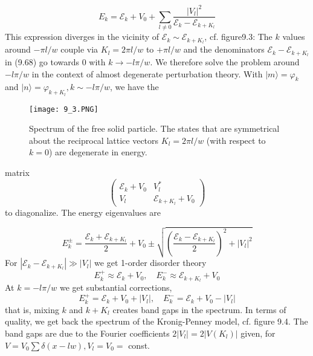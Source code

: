 \begin{equation}
    E_{k}=\mathcal{E}_{k}+V_{0}+\sum_{l \neq 0} \frac{\left|V_{l}\right|^{2}}{\mathcal{E}_{k}-\mathcal{E}_{k+K_{l}}}
    \end{equation}
This expression diverges in the vicinity of $\mathcal{E}_{k} \sim \mathcal{E}_{k+K_{l}}$, cf. figure9.3: The $k$ values ​​around $−\pi l / w$ couple via $K_{l}=2 \pi l / w$ to $+\pi l/w$ and the denominators $\mathcal{E}_{k} - \mathcal{E}_{k+K_{l}}$ in (9.68) go towards 0 with $k \rightarrow −l\pi / w$. We therefore solve the problem around $−l\pi / w$ in the context of almost degenerate perturbation theory. With $| m\rangle = \varphi_k$ and $| n\rangle = \varphi_{k + K_l}, k \sim −l\pi / w$, we have the
\begin{figure}[ht]
        \centering
        \texttt{[image: 9\_3.PNG]}
        \caption{Spectrum of the free solid particle. The states that are symmetrical about the reciprocal lattice vectors $K_l=2\pi l/w$ (with respect to $k = 0$) are degenerate in energy.}
\end{figure}
matrix
\begin{equation}
\left(\begin{array}{cc}{\mathcal{E}_{k}+V_{0}} & {V_{l}^{*}} \\ {V_{l}} & {\mathcal{E}_{k+K_{l}}+V_{0}}\end{array}\right)
\end{equation}
to diagonalize. The energy eigenvalues ​​are

\begin{equation}
    E_{k}^{\pm}=\frac{\mathcal{E}_{k}+\mathcal{E}_{k+K_{l}}}{2}+V_{0} \pm \sqrt{\left(\frac{\mathcal{E}_{k}-\mathcal{E}_{k+K_{l}}}{2}\right)^{2}+\left|V_{l}\right|^{2}}
    \end{equation}
For $\left|\mathcal{E}_{k}-\mathcal{E}_{k+K_{l}}\right| \gg\left|V_{l}\right|$ we get 1-order disorder theory
\begin{equation}
    E_{k}^{+} \approx \mathcal{E}_{k}+V_{0}, \quad E_{k}^{-} \approx \mathcal{E}_{k+K_{l}}+V_{0}
    \end{equation}
At $k = −l\pi / w$ we get substantial corrections,
\begin{equation}
    E_{k}^{+}=\mathcal{E}_{k}+V_{0}+\left|V_{l}\right|, \quad E_{k}^{-}=\mathcal{E}_{k}+V_{0}-\left|V_{l}\right|
    \end{equation}
that is, mixing $k$ and $k + K_l$ creates band gaps in the spectrum. In terms of quality, we get back the spectrum of the Kronig-Penney model, cf. figure 9.4. The band gaps are due to the Fourier coefficients $2 | V_l | = 2 | V (K_l) |$ given, for $V = V_0 \sum\delta (x-lw), V_l = V_0 =$ const.

